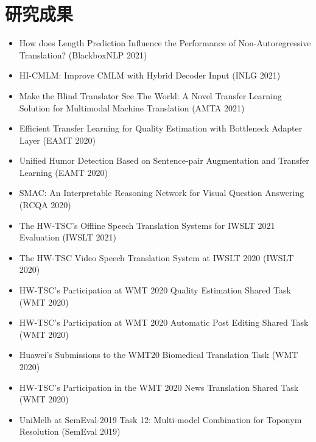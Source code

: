 \documentclass{resume}
\begin{document}
\section{研究成果}
\begin{itemize}[parsep=0.2ex]
  \item How does Length Prediction Influence the Performance of Non-Autoregressive Translation? (BlackboxNLP 2021)
  \item HI-CMLM: Improve CMLM with Hybrid Decoder Input (INLG 2021)
  \item Make the Blind Translator See The World: A Novel Transfer Learning Solution for Multimodal Machine Translation (AMTA 2021)
  \item Efficient Transfer Learning for Quality Estimation with Bottleneck Adapter Layer (EAMT 2020)
  \item Unified Humor Detection Based on Sentence-pair Augmentation and Transfer Learning (EAMT 2020)
  \item SMAC: An Interpretable Reasoning Network for Visual Question Answering (RCQA 2020)
  \item The HW-TSC's Offline Speech Translation Systems for IWSLT 2021 Evaluation (IWSLT 2021)
  \item The HW-TSC Video Speech Translation System at IWSLT 2020 (IWSLT 2020)
  \item HW-TSC's Participation at WMT 2020 Quality Estimation Shared Task (WMT 2020)
  \item HW-TSC's Participation at WMT 2020 Automatic Post Editing Shared Task (WMT 2020)
  \item Huawei's Submissions to the WMT20 Biomedical Translation Task (WMT 2020)
  \item HW-TSC's Participation in the WMT 2020 News Translation Shared Task (WMT 2020)
  \item UniMelb at SemEval-2019 Task 12: Multi-model Combination for Toponym Resolution (SemEval 2019)
\end{itemize}


\end{document}
